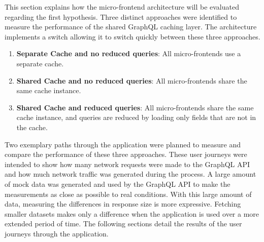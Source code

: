 This section explains how the micro-frontend architecture will be evaluated regarding the first hypothesis. Three distinct approaches were identified to measure the performance of the shared GraphQL caching layer. The architecture implements a switch allowing it to switch quickly between these three approaches.

\begin{enumerate}
  \item \textbf{Separate Cache and no reduced queries}: All micro-frontends use a separate cache.
  \item \textbf{Shared Cache and no reduced queries}: All micro-frontends share the same cache instance.
  \item \textbf{Shared Cache and reduced queries}: All micro-frontends share the same cache instance, and queries are reduced by loading only fields that are not in the cache.
\end{enumerate}

\noindent Two exemplary paths through the application were planned to measure and compare the performance of these three approaches. These user journeys were intended to show how many network requests were made to the GraphQL \ac{API} and how much network traffic was generated during the process. A large amount of mock data was generated and used by the GraphQL \ac{API} to make the measurements as close as possible to real conditions. With this large amount of data, measuring the differences in response size is more expressive. Fetching smaller datasets makes only a difference when the application is used over a more extended period of time. The following sections detail the results of the user journeys through the application.






